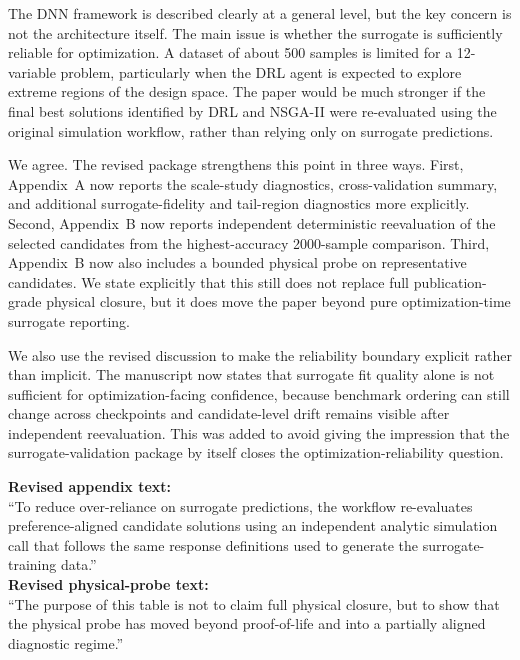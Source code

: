 \begin{ReviewerComment}
The DNN framework is described clearly at a general level, but the key concern is not the architecture itself. The main issue is whether the surrogate is sufficiently reliable for optimization. A dataset of about 500 samples is limited for a 12-variable problem, particularly when the DRL agent is expected to explore extreme regions of the design space. The paper would be much stronger if the final best solutions identified by DRL and NSGA-II were re-evaluated using the original simulation workflow, rather than relying only on surrogate predictions.
\end{ReviewerComment}
%
\begin{Answer}
We agree. The revised package strengthens this point in three ways. First, Appendix~A now reports the scale-study diagnostics, cross-validation summary, and additional surrogate-fidelity and tail-region diagnostics more explicitly. Second, Appendix~B now reports independent deterministic reevaluation of the selected candidates from the highest-accuracy 2000-sample comparison. Third, Appendix~B now also includes a bounded physical probe on representative candidates. We state explicitly that this still does not replace full publication-grade physical closure, but it does move the paper beyond pure optimization-time surrogate reporting.

We also use the revised discussion to make the reliability boundary explicit rather than implicit. The manuscript now states that surrogate fit quality alone is not sufficient for optimization-facing confidence, because benchmark ordering can still change across checkpoints and candidate-level drift remains visible after independent reevaluation. This was added to avoid giving the impression that the surrogate-validation package by itself closes the optimization-reliability question.
\end{Answer}
\begin{RevisionExcerpt}
\noindent\textbf{Revised appendix text:}\\
``To reduce over-reliance on surrogate predictions, the workflow re-evaluates preference-aligned candidate solutions using an independent analytic simulation call that follows the same response definitions used to generate the surrogate-training data.''\\[0.5em]
\noindent\textbf{Revised physical-probe text:}\\
``The purpose of this table is not to claim full physical closure, but to show that the physical probe has moved beyond proof-of-life and into a partially aligned diagnostic regime.''
\end{RevisionExcerpt}

